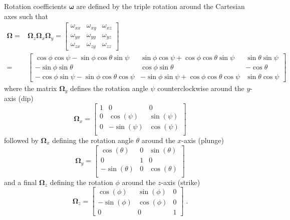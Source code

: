 Rotation coefficients $\boldsymbol{\omega}$ are defined by the triple rotation around the Cartesian axes such that
\begin{equation}\label{RotationMatrix}
\begin{split}
\boldsymbol{\Omega} =& \boldsymbol{\Omega}_z\boldsymbol{\Omega}_x\boldsymbol{\Omega}_y =
\begin{bmatrix}
\omega_{xx} & \omega_{xy} & \omega_{xz} \\
\omega_{yx} & \omega_{yy} & \omega_{yz}\\
\omega_{zx} & \omega_{zy} & \omega_{zz}
\end{bmatrix} \\
=&\begin{bmatrix}
\cos \phi \cos \psi - \sin \phi \cos \theta \sin \psi & \sin \phi \cos \psi + \cos \phi \cos \theta \sin \psi & \sin \theta \sin \psi \\
- \sin \phi \sin \theta & \cos\phi \sin \theta & -\cos \theta\\
-\cos \phi \sin \psi - \sin \phi \cos \theta \cos \psi & -\sin \phi \sin \psi + \cos \phi \cos \theta \cos \psi & \sin \theta \cos \psi
\end{bmatrix}
\end{split}
\end{equation}
where the matrix $\boldsymbol{\Omega}_y$ defines the rotation angle $\psi$ counterclockwise around the $y$-axis (dip)
\begin{equation}
\boldsymbol{\Omega}_x =
\begin{bmatrix}
1 & 0 & 0 \\
0 & \cos(\psi) & \sin(\psi) \\
0 & -\sin(\psi) & \cos(\psi) \\
\end{bmatrix}
\end{equation}
followed by $\boldsymbol{\Omega}_x$ defining the rotation angle $\theta$ around the $x$-axis (plunge)
\begin{equation}
\boldsymbol{\Omega}_y =
\begin{bmatrix}
\cos(\theta) & 0 & \sin(\theta) \\
0 & 1 & 0\\
-\sin(\theta) & 0 & \cos(\theta) \\
\end{bmatrix}
\end{equation}
and a final $\boldsymbol{\Omega}_z$ defining the rotation $\phi$ around the $z$-axis (strike)
\begin{equation}
\boldsymbol{\Omega}_z =
\begin{bmatrix}
\cos(\phi) & \sin(\phi) & 0 \\
-\sin(\phi) & \cos(\phi) & 0\\
0 & 0 & 1
\end{bmatrix}\;.
\end{equation}
